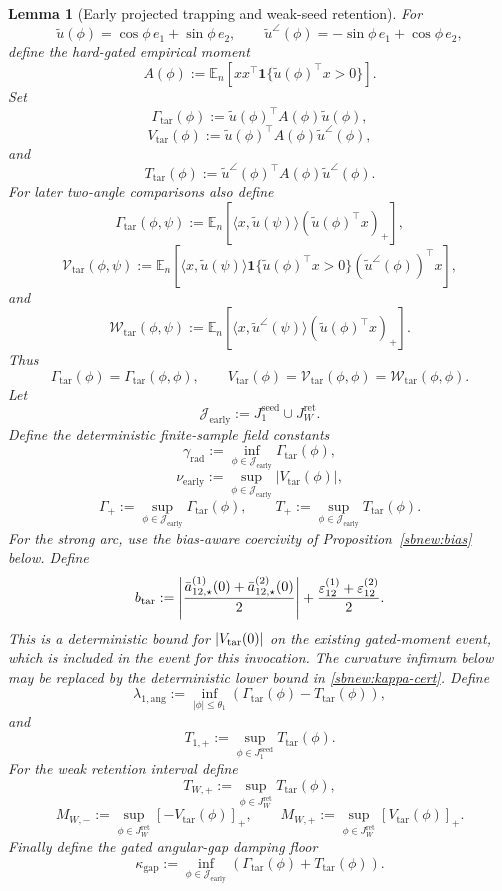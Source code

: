 \documentclass{article} %
\theoremstyle{plain}
\newtheorem{lemma}[theorem]{Lemma}
\theoremstyle{definition}
\theoremstyle{remark}
\begin{document}
\begin{lemma}[Early projected trapping and weak-seed retention]
For
\[
\widetilde u(\phi)
=
\cos\phi\,e_1+\sin\phi\,e_2,
\qquad
\widetilde u^\angle(\phi)
=
-\sin\phi\,e_1+\cos\phi\,e_2,
\]
define the hard-gated empirical moment
\[
\boxed{
A(\phi)
:=
\mathbb E_n
\left[
xx^\top
\mathbf 1\{\widetilde u(\phi)^\top x>0\}
\right].
}
\]
Set
\[
\boxed{
\Gamma_{\mathrm{tar}}(\phi)
:=
\widetilde u(\phi)^\top A(\phi)\widetilde u(\phi),
}
\]
\[
\boxed{
V_{\mathrm{tar}}(\phi)
:=
\widetilde u(\phi)^\top A(\phi)\widetilde u^\angle(\phi),
}
\]
and
\[
\boxed{
T_{\mathrm{tar}}(\phi)
:=
\widetilde u^\angle(\phi)^\top A(\phi)\widetilde u^\angle(\phi).
}
\]
For later two-angle comparisons also define
\[
\boxed{
\Gamma_{\mathrm{tar}}(\phi,\psi)
:=
\mathbb E_n
\left[
\langle x,\widetilde u(\psi)\rangle
(\widetilde u(\phi)^\top x)_+
\right],
}
\]
\[
\boxed{
\mathcal V_{\mathrm{tar}}(\phi,\psi)
:=
\mathbb E_n
\left[
\langle x,\widetilde u(\psi)\rangle
\mathbf 1\{\widetilde u(\phi)^\top x>0\}
(\widetilde u^\angle(\phi))^\top x
\right],
}
\]
and
\[
\boxed{
\mathcal W_{\mathrm{tar}}(\phi,\psi)
:=
\mathbb E_n
\left[
\langle x,\widetilde u^\angle(\psi)\rangle
(\widetilde u(\phi)^\top x)_+
\right].
}
\]
Thus
\[
\Gamma_{\mathrm{tar}}(\phi)
=
\Gamma_{\mathrm{tar}}(\phi,\phi),
\qquad
V_{\mathrm{tar}}(\phi)
=
\mathcal V_{\mathrm{tar}}(\phi,\phi)
=
\mathcal W_{\mathrm{tar}}(\phi,\phi).
\]
Let
\[
\mathcal J_{\mathrm{early}}
:=
J_1^{\mathrm{seed}}
\cup
J_W^{\mathrm{ret}}.
\]
Define the deterministic finite-sample field constants
\[
\boxed{
\gamma_{\mathrm{rad}}
:=
\inf_{\phi\in\mathcal J_{\mathrm{early}}}
\Gamma_{\mathrm{tar}}(\phi),
}
\]
\[
\boxed{
\nu_{\mathrm{early}}
:=
\sup_{\phi\in\mathcal J_{\mathrm{early}}}
|V_{\mathrm{tar}}(\phi)|,
}
\]
\[
\boxed{
\Gamma_+
:=
\sup_{\phi\in\mathcal J_{\mathrm{early}}}
\Gamma_{\mathrm{tar}}(\phi),
\qquad
T_+
:=
\sup_{\phi\in\mathcal J_{\mathrm{early}}}
T_{\mathrm{tar}}(\phi).
}
\]
For the strong arc, use the bias-aware coercivity of
Proposition~\ref{sbnew:bias} below. Define
\[
b_{\rm tar}:=
\left|\frac{\bar a_{12,\star}^{(1)}(0)+\bar a_{12,\star}^{(2)}(0)}2\right|
+\frac{\varepsilon_{12}^{(1)}+\varepsilon_{12}^{(2)}}2.
\]
This is a deterministic bound for $|V_{\rm tar}(0)|$ on the existing
gated-moment event, which is included in the event for this invocation.
The curvature infimum below may be replaced by the deterministic lower
bound in \eqref{sbnew:kappa-cert}. Define
\[
\boxed{
\lambda_{1,\mathrm{ang}}
:=
\inf_{|\phi|\le\theta_1}
\left(\Gamma_{\mathrm{tar}}(\phi)-T_{\mathrm{tar}}(\phi)\right),
}
\]
and
\[
\boxed{
T_{1,+}
:=
\sup_{\phi\in J_1^{\mathrm{seed}}}
T_{\mathrm{tar}}(\phi).
}
\]
For the weak retention interval define
\[
\boxed{
T_{W,+}
:=
\sup_{\phi\in J_W^{\mathrm{ret}}}
T_{\mathrm{tar}}(\phi),
}
\]
\[
\boxed{
M_{W,-}
:=
\sup_{\phi\in J_W^{\mathrm{ret}}}
[-V_{\mathrm{tar}}(\phi)]_+,
\qquad
M_{W,+}
:=
\sup_{\phi\in J_W^{\mathrm{ret}}}
[V_{\mathrm{tar}}(\phi)]_+.
}
\]
Finally define the gated angular-gap damping floor
\[
\boxed{
\kappa_{\mathrm{gap}}
:=
\inf_{\phi\in\mathcal J_{\mathrm{early}}}
\left(
\Gamma_{\mathrm{tar}}(\phi)
+
T_{\mathrm{tar}}(\phi)
\right).
}
\]


\end{lemma}
\end{document}
